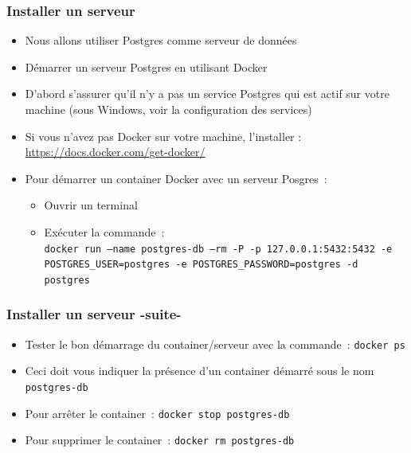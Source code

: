 \documentclass[aspectratio=169,10pt]{beamer}
\begin{document}
\begin{frame}
	\frametitle{Installer un serveur}
	\begin{itemize}
		\item Nous allons utiliser Postgres comme serveur de données
		\item Démarrer un serveur Postgres en utilisant Docker
		\item D'abord s'assurer qu'il n'y a pas un service Postgres qui est actif sur votre machine (sous Windows, voir la configuration des services)
		\item Si vous n'avez pas Docker sur votre machine, l'installer : \url{https://docs.docker.com/get-docker/}
		\item Pour démarrer un container Docker avec un serveur Posgres~:
		\begin{itemize}
			\item Ouvrir un terminal
			\item Exécuter la commande~:\\ {\footnotesize \texttt{docker run ---name postgres-db ---rm -P -p 127.0.0.1:5432:5432 -e POSTGRES\_USER=postgres
					 -e POSTGRES\_PASSWORD=postgres -d postgres} }
		\end{itemize}

	\end{itemize}
\end{frame}	

\begin{frame}
	\frametitle{Installer un serveur -suite-}
	\begin{itemize}
		
		\item Tester le bon démarrage du container/serveur avec la commande~: \texttt{docker ps}
		
		\item[] Ceci doit vous indiquer la présence d'un container démarré sous le nom \texttt{postgres-db} 
		
		\item Pour arrêter le container~: \texttt{docker stop postgres-db}
		
		\item Pour supprimer le container~: \texttt{docker rm postgres-db}
		
		
\end{itemize}
\end{frame}	
\end{document}
